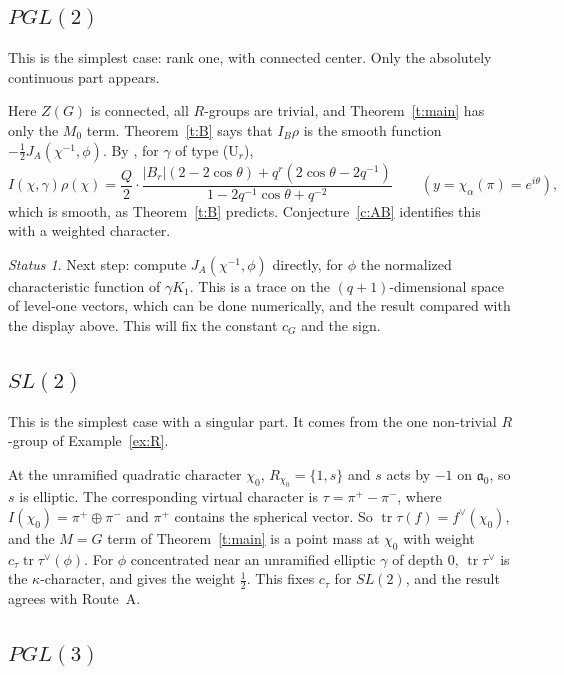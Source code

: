 \documentclass[12pt,letterpaper]{article}
\numberwithin{equation}{section}
\theoremstyle{plain}
\theoremstyle{definition}
\theoremstyle{remark}
\newtheorem{status}[theorem]{Status}
\newcommand{\fa}{\mathfrak{a}}
\DeclareMathOperator{\tr}{tr}
\begin{document}
\subsection{\texorpdfstring{$PGL(2)$}{PGL(2)}}\label{s:pgl2}

This is the simplest case: rank one, with connected center. Only the absolutely continuous part appears.

Here $Z(G)$ is connected, all $R$-groups are trivial, and Theorem~\ref{t:main} has only the $M_0$ term. Theorem~\ref{t:B} says that $I_B\rho$ is the smooth function $-\frac12J_{A}(\chi^{-1},\phi)$. By \cite[Thm.~6.1, Rem.~6.2]{JC26}, for $\gamma$ of type (U$_r$),
\[
I(\chi,\gamma)\rho(\chi)=\frac Q2\cdot\frac{|B_r|(2-2\cos\theta)+q^r(2\cos\theta-2q^{-1})}{1-2q^{-1}\cos\theta+q^{-2}}\qquad(y=\chi_\alpha(\pi)=e^{i\theta}),
\]
which is smooth, as Theorem~\ref{t:B} predicts. Conjecture~\ref{c:AB} identifies this with a weighted character.

\begin{status}
Next step: compute $J_A(\chi^{-1},\phi)$ directly, for $\phi$ the normalized characteristic function of $\gamma K_1$. This is a trace on the $(q+1)$-dimensional space of level-one vectors, which can be done numerically, and the result compared with the display above. This will fix the constant $c_G$ and the sign.
\end{status}

\subsection{\texorpdfstring{$SL(2)$}{SL(2)}}\label{s:sl2}

This is the simplest case with a singular part. It comes from the one non-trivial $R$-group of Example~\ref{ex:R}.

At the unramified quadratic character $\chi_0$, $R_{\chi_0}=\{1,s\}$ and $s$ acts by $-1$ on $\fa_0$, so $s$ is elliptic. The corresponding virtual character is $\tau=\pi^+-\pi^-$, where $I(\chi_0)=\pi^+\oplus\pi^-$ and $\pi^+$ contains the spherical vector. So $\tr\tau(f)=f^\vee(\chi_0)$, and the $M=G$ term of Theorem~\ref{t:main} is a point mass at $\chi_0$ with weight $c_\tau\tr\tau^\vee(\phi)$. For $\phi$ concentrated near an unramified elliptic $\gamma$ of depth $0$, $\tr\tau^\vee$ is the $\kappa$-character, and \cite[Prop.~6.4]{JC26} gives the weight $\frac12$. This fixes $c_\tau$ for $SL(2)$, and the result agrees with Route~A.

\subsection{\texorpdfstring{$PGL(3)$}{PGL(3)}}\label{s:pgl3}
\end{document}
